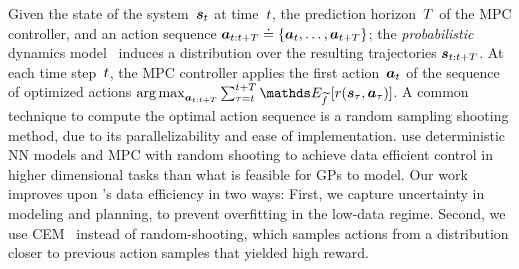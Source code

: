 Given the state of the system~$\boldsymbol{s}_t$ at time~$t$, the prediction horizon~$T$ of the MPC controller, and an action sequence $\boldsymbol{a}_{t:t+T} \doteq \{\boldsymbol{a}_t, \dots, \boldsymbol{a}_{t + T}\}$; the \textit{probabilistic} dynamics model~\smash{$\dynamicsModel$} induces a distribution over the resulting trajectories $\boldsymbol{s}_{t:t + T}$. 
At each time step~$t$, the MPC controller applies the first action~$\boldsymbol{a}_{t}$ of the sequence of optimized actions $\argmax_{\MDPAction_{\MDPTime:\MDPTime + \horizon}}{\sum_{\traj=\MDPTime}^{\MDPTime+\horizon}   \E_{\dynamicsModel} \left[ \MDPreward(\MDPState_{\traj}, \MDPAction_{\traj}) \right] }$.
%
A common technique to compute the optimal action sequence is a random sampling shooting method, due to its parallelizability and ease of implementation. 
\cite{Nagabandi2017} use deterministic NN models and MPC with random shooting to achieve data efficient control in higher dimensional tasks than what is feasible for GPs to model. 
Our work improves upon \cite{Nagabandi2017}'s data efficiency in two ways: 
First, we capture uncertainty in modeling and planning, to prevent overfitting in the low-data regime.
Second, we use CEM~\citep{botev2013} instead of random-shooting, which samples actions from a distribution closer to previous action samples that yielded high reward.

